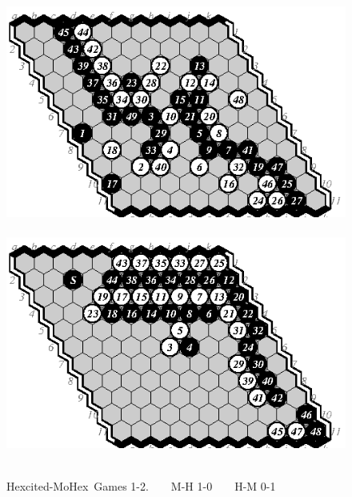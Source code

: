 \documentclass{icga}
\def\Hite{\mbox{\sc Hexcited}}
\def\Mx{\mbox{\sc MoHex}}
\begin{document}
\begin{figure}[hbp]
\noindent\hfill\includegraphics[scale=1]{pix/11.mh1.eps}\
\hfill\includegraphics[scale=1]{pix/11.hm2.eps}\hfill~
\caption{\Hite-\Mx\ Games 1-2. ~ ~ M-H 1-0 ~ ~ H-M 0-1}
\end{figure}
\end{document}
